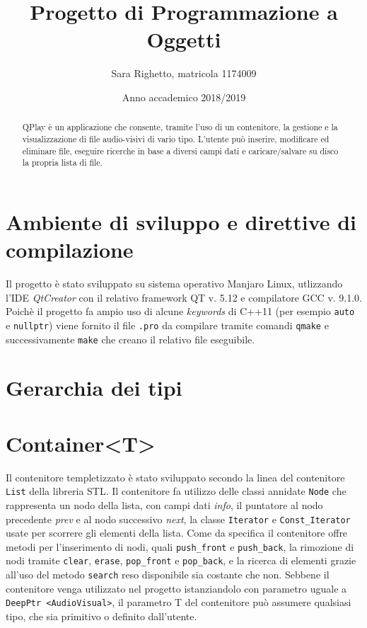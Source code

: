 

\title{Progetto di Programmazione a Oggetti}
\author{Sara Righetto, matricola 1174009}
\date{Anno accademico 2018/2019}


    \maketitle
    \begin{abstract}
        QPlay è un applicazione che consente, tramite l'uso di un contenitore, la gestione e la visualizzazione di file audio-visivi di vario tipo. L'utente può inserire, modificare ed eliminare file, eseguire ricerche in base a diversi campi dati e caricare/salvare su disco la propria lista di file.
    \end{abstract}

    \section*{Ambiente di sviluppo e direttive di compilazione}
        Il progetto è stato sviluppato su sistema operativo Manjaro Linux, utlizzando l'IDE \textit{QtCreator} con il relativo framework QT v. 5.12 e compilatore GCC v. 9.1.0. \newline
        Poichè il progetto fa ampio uso di alcune \textit{keywords} di C++11 (per esempio \texttt{auto} e \texttt{nullptr}) viene fornito il file \texttt{.pro} da compilare tramite comandi \texttt{qmake} e successivamente \texttt{make} che creano il relativo file eseguibile.

    \section*{Gerarchia dei tipi}
        

    \section*{Container<T>}
        Il contenitore templetizzato è stato sviluppato secondo la linea del contenitore \texttt{List} della libreria STL. \newline
        Il contenitore fa utilizzo delle classi annidate \texttt{Node} che rappresenta un nodo della lista, con campi dati \textit{info}, il puntatore al nodo precedente \textit{prev} e al nodo successivo \textit{next}, la classe \texttt{Iterator} e \texttt{Const\_Iterator} usate per scorrere gli elementi della lista. \newline
        Come da specifica il contenitore offre metodi per l'inserimento di nodi, quali \texttt{push\_front} e \texttt{push\_back}, la rimozione di nodi tramite \texttt{clear}, \texttt{erase}, \texttt{pop\_front} e \texttt{pop\_back}, e la ricerca di elementi grazie all'uso del metodo \texttt{search} reso disponibile sia costante che non. \newline
        Sebbene il contenitore venga utilizzato nel progetto istanziandolo con parametro uguale a \texttt{DeepPtr <AudioVisual>}, il parametro T del contenitore può assumere qualsiasi tipo, che sia primitivo o definito dall'utente.

